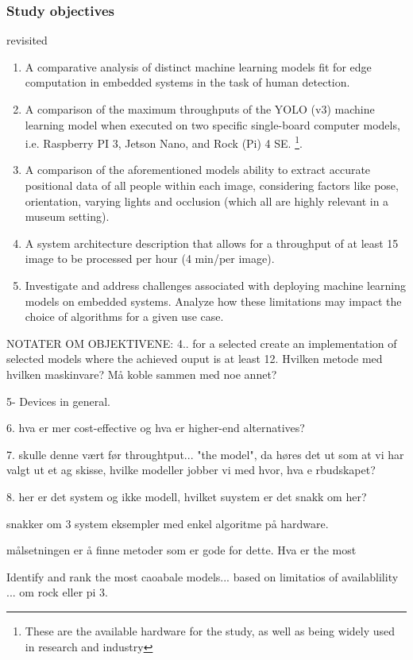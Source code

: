 \subsubsection*{Study objectives} revisited
\begin{enumerate}
    \item A comparative analysis of distinct machine learning models fit for edge computation in embedded systems in the task of human detection.
    \item A comparison of the maximum throughputs of the YOLO (v3) machine learning model when executed on two specific single-board computer models, i.e. Raspberry PI 3, Jetson Nano, and Rock (Pi) 4 SE. \footnote{These are the available hardware for the study, as well as being widely used in research and industry}.
    \item A comparison of the aforementioned models ability to extract accurate positional data of all people within each image, considering factors like pose, orientation, varying lights and occlusion (which all are highly relevant in a museum setting).
    \item A system architecture description that allows for a throughput of at least 15 image to be processed per hour (4 min/per image).
    \item Investigate and address challenges associated with deploying machine learning models on embedded systems. Analyze how these limitations may impact the choice of algorithms for a given use case.
\end{enumerate}

NOTATER OM OBJEKTIVENE:
4.. for a selected create an implementation of selected models where the achieved ouput is at least 12. Hvilken metode med hvilken maskinvare? Må koble sammen med noe annet?

5- Devices in general.

6. hva er mer cost-effective og hva er higher-end alternatives?

7. skulle denne vært før throughtput... 
"the model", da høres det ut som at vi har valgt ut et 
ag skisse, hvilke modeller jobber vi med hvor, hva e rbudskapet?

8. her er det system og ikke modell, hvilket suystem er det snakk om her? 

snakker om 3 system eksempler med enkel algoritme på hardware. 


målsetningen er å finne metoder som er gode for dette. Hva er the most 

Identify and rank the most caoabale models...
based on limitatios of availablility ... om rock eller pi 3. 

